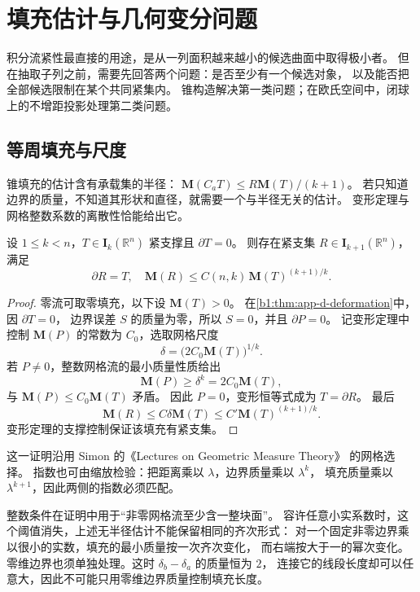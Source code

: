 \section{填充估计与几何变分问题}
\label{b1:sec:D106}

积分流紧性最直接的用途，是从一列面积越来越小的候选曲面中取得极小者。
但在抽取子列之前，需要先回答两个问题：是否至少有一个候选对象，
以及能否把全部候选限制在某个共同紧集内。
锥构造解决第一类问题；在欧氏空间中，闭球上的不增距投影处理第二类问题。

\subsection{等周填充与尺度}
\label{b1:subsec:D10601}

锥填充的估计含有承载集的半径：
\(\mathbf M(C_aT)\leq R\mathbf M(T)/(k+1)\)。
若只知道边界的质量，不知道其形状和直径，就需要一个与半径无关的估计。
变形定理与网格整数系数的离散性恰能给出它。

\begin{theorem}\label{b1:thm:app-d-isoperimetric}
设 \(1\leq k<n\)，\(T\in\mathbf I_k(\mathbb R^n)\) 紧支撑且 \(\partial T=0\)。
则存在紧支集 \(R\in\mathbf I_{k+1}(\mathbb R^n)\)，满足
\[
 \partial R=T,\quad
 \mathbf M(R)\leq C(n,k)\,\mathbf M(T)^{(k+1)/k}.
\]
\end{theorem}
\begin{proof}
零流可取零填充，以下设 \(\mathbf M(T)>0\)。
在\cref{b1:thm:app-d-deformation}中，因 \(\partial T=0\)，
边界误差 \(S\) 的质量为零，所以 \(S=0\)，并且 \(\partial P=0\)。
记变形定理中控制 \(\mathbf M(P)\) 的常数为 \(C_0\)，选取网格尺度
\[
 \delta=\bigl(2C_0\mathbf M(T)\bigr)^{1/k}.
\]
若 \(P\neq0\)，整数网格流的最小质量性质给出
\[
 \mathbf M(P)\geq\delta^k=2C_0\mathbf M(T),
\]
与 \(\mathbf M(P)\leq C_0\mathbf M(T)\) 矛盾。
因此 \(P=0\)，变形恒等式成为 \(T=\partial R\)。
最后
\[
 \mathbf M(R)\leq C\delta\mathbf M(T)
        \leq C'\mathbf M(T)^{(k+1)/k}.
\]
变形定理的支撑控制保证该填充有紧支集。
\end{proof}

这一证明沿用 Simon 的《Lectures on Geometric Measure Theory》%
\cite[30.1 THEOREM]{Simon1983Lectures}的网格选择。
指数也可由缩放检验：把距离乘以 \(\lambda\)，边界质量乘以 \(\lambda^k\)，
填充质量乘以 \(\lambda^{k+1}\)，因此两侧的指数必须匹配。

\ProseParagraphBreak

整数条件在证明中用于“非零网格流至少含一整块面”。
容许任意小实系数时，这个阈值消失，上述无半径估计不能保留相同的齐次形式：
对一个固定非零边界乘以很小的实数，填充的最小质量按一次齐次变化，
而右端按大于一的幂次变化。
零维边界也须单独处理。这时 \(\delta_b-\delta_a\) 的质量恒为 \(2\)，
连接它的线段长度却可以任意大，因此不可能只用零维边界质量控制填充长度。

